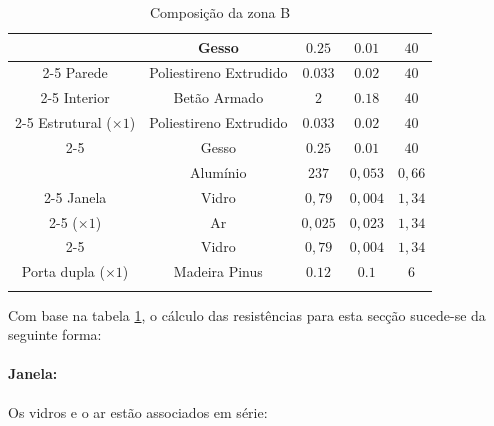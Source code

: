 \documentclass[12pt, a4paper]{article}
\begin{document}
\begin{table}[htpb]
\begin{center}
\begin{tabular}{c c c c c}
			\multirow{5}{*}{}          & Gesso                  & $0.25$                            & $0.01$                       & $40$          \\
				\cline{2-5}
			Parede                     & Poliestireno Extrudido & $0.033$                           & $0.02$                       & $40$          \\
				\cline{2-5}
			Interior                   & Betão Armado           & $2$                               & $0.18$                       & $40$          \\
				\cline{2-5}
			Estrutural ($\times 1$)    & Poliestireno Extrudido & $0.033$                           & $0.02$                       & $40$          \\
				\cline{2-5}
			                           & Gesso                  & $0.25$                            & $0.01$                       & $40$          \\
				\midrule{}

			\multirow{5}{*}{}		   & Alumínio 				& $237$                            	& $0,053$                      & $0,66$		   \\
				\cline{2-5}
			Janela    				   & Vidro    				& $0,79$                           	& $0,004$                      & $1,34$		   \\
				\cline{2-5}
			($\times 1$)			   & Ar       				& $0,025$                          	& $0,023$                      & $1,34$		   \\
				\cline{2-5}
									   & Vidro    				& $0,79$                           	& $0,004$                      & $1,34$		   \\
				\midrule{}
			Porta dupla ($\times 1$)   & Madeira Pinus          & $0.12$                            & $0.1$                        & $6$           \\
			\bottomrule{}
		\end{tabular}
	\end{center}
	\caption{Composição da zona B}\label{tab:zona_b}
\end{table}

Com base na tabela \ref*{tab:zona_b}, o cálculo das resistências para esta secção sucede-se da seguinte forma:

\paragraph{Janela:}\label{par:zona_b_janela}Os vidros e o ar estão associados em série:
\end{document}
